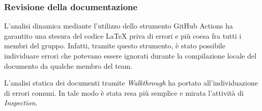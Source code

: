 \subsubsection{Revisione della documentazione}

L'analisi dinamica mediante l'utilizzo dello strumento GitHub Actions ha garantito una stesura del codice \LaTeX{} priva di errori e più coesa fra tutti i membri del gruppo. Infatti, tramite questo strumento, è stato possibile individuare errori che potevano essere ignorati durante la compilazione locale del documento da qualche membro del team.

L'analisi statica dei documenti tramite \textit{Walkthrough} ha portato all'individuazione di errori comuni. In tale modo è stata resa più semplice e mirata l'attività di \textit{Inspection}.


